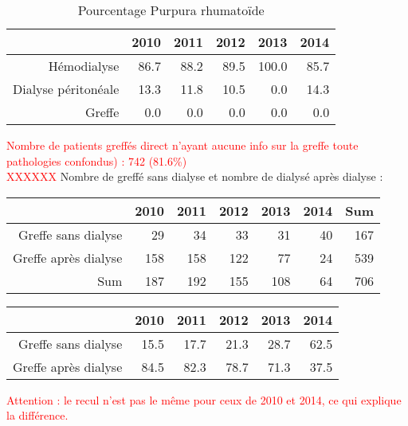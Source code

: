 \documentclass[11pt,a4paper]{article}\usepackage[]{graphicx}\usepackage[]{color}
\begin{document}
\begin{table}[H]
\centering
\begin{tabular}{rrrrrr}
  \hline
 & 2010 & 2011 & 2012 & 2013 & 2014 \\ 
  \hline
Hémodialyse & 86.7 & 88.2 & 89.5 & 100.0 & 85.7 \\ 
  Dialyse péritonéale & 13.3 & 11.8 & 10.5 & 0.0 & 14.3 \\ 
  Greffe & 0.0 & 0.0 & 0.0 & 0.0 & 0.0 \\ 
   \hline
\end{tabular}
\caption{Pourcentage Purpura rhumatoïde} 
\end{table}



\textcolor{red}{Nombre de patients greffés direct n'ayant aucune info sur la greffe toute pathologies confondus) : 742 (81.6\%)}
~\\

\textcolor{red}{XXXXXX} Nombre de greffé sans dialyse et nombre de dialysé après dialyse :

\begin{table}[H]
\centering
\begin{tabular}{rrrrrrr}
  \hline
 & 2010 & 2011 & 2012 & 2013 & 2014 & Sum \\ 
  \hline
Greffe sans dialyse & 29 & 34 & 33 & 31 & 40 & 167 \\ 
  Greffe après dialyse & 158 & 158 & 122 & 77 & 24 & 539 \\ 
  Sum & 187 & 192 & 155 & 108 & 64 & 706 \\ 
   \hline
\end{tabular}
\end{table}
\begin{table}[H]
\centering
\begin{tabular}{rrrrrr}
  \hline
 & 2010 & 2011 & 2012 & 2013 & 2014 \\ 
  \hline
Greffe sans dialyse & 15.5 & 17.7 & 21.3 & 28.7 & 62.5 \\ 
  Greffe après dialyse & 84.5 & 82.3 & 78.7 & 71.3 & 37.5 \\ 
   \hline
\end{tabular}
\end{table}


\textcolor{red}{Attention : le recul n'est pas le même pour ceux de 2010 et 2014, ce qui explique la différence.}
~\\
\end{document}
